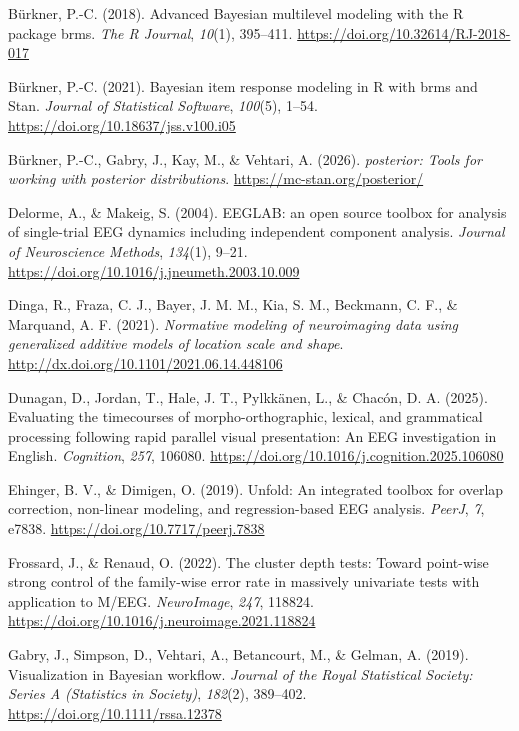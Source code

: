 \documentclass[
  doc,
  floatsintext,
  longtable,
  a4paper,
  nolmodern,
  notxfonts,
  notimes,
  colorlinks=true,linkcolor=blue,citecolor=blue,urlcolor=blue]{apa7}
\newlength{\cslhangindent}
\newenvironment{CSLReferences}[2] %
 {\begin{list}{}{%
  \setlength{\itemindent}{0pt}
  \setlength{\leftmargin}{0pt}
  \setlength{\parsep}{0pt}
  \ifodd #1
   \setlength{\leftmargin}{\cslhangindent}
   \setlength{\itemindent}{-1\cslhangindent}
  \fi
  \setlength{\itemsep}{#2\baselineskip}}}
 {\end{list}}
\begin{document}
\begin{CSLReferences}{1}{0}
Bürkner, P.-C. (2018). Advanced {Bayesian} multilevel modeling with the
{R} package {brms}. \emph{The R Journal}, \emph{10}(1), 395--411.
\url{https://doi.org/10.32614/RJ-2018-017}

Bürkner, P.-C. (2021). Bayesian item response modeling in {R} with
{brms} and {Stan}. \emph{Journal of Statistical Software},
\emph{100}(5), 1--54. \url{https://doi.org/10.18637/jss.v100.i05}

Bürkner, P.-C., Gabry, J., Kay, M., \& Vehtari, A. (2026).
\emph{{posterior}: Tools for working with posterior distributions}.
\url{https://mc-stan.org/posterior/}

Delorme, A., \& Makeig, S. (2004). EEGLAB: an open source toolbox for
analysis of single-trial EEG dynamics including independent component
analysis. \emph{Journal of Neuroscience Methods}, \emph{134}(1), 9--21.
\url{https://doi.org/10.1016/j.jneumeth.2003.10.009}

Dinga, R., Fraza, C. J., Bayer, J. M. M., Kia, S. M., Beckmann, C. F.,
\& Marquand, A. F. (2021). \emph{Normative modeling of neuroimaging data
using generalized additive models of location scale and shape}.
\url{http://dx.doi.org/10.1101/2021.06.14.448106}

Dunagan, D., Jordan, T., Hale, J. T., Pylkkänen, L., \& Chacón, D. A.
(2025). Evaluating the timecourses of morpho-orthographic, lexical, and
grammatical processing following rapid parallel visual presentation: An
EEG investigation in English. \emph{Cognition}, \emph{257}, 106080.
\url{https://doi.org/10.1016/j.cognition.2025.106080}

Ehinger, B. V., \& Dimigen, O. (2019). Unfold: An integrated toolbox for
overlap correction, non-linear modeling, and regression-based {EEG}
analysis. \emph{PeerJ}, \emph{7}, e7838.
\url{https://doi.org/10.7717/peerj.7838}

Frossard, J., \& Renaud, O. (2022). The cluster depth tests: Toward
point-wise strong control of the family-wise error rate in massively
univariate tests with application to M/EEG. \emph{NeuroImage},
\emph{247}, 118824.
\url{https://doi.org/10.1016/j.neuroimage.2021.118824}

Gabry, J., Simpson, D., Vehtari, A., Betancourt, M., \& Gelman, A.
(2019). Visualization in Bayesian work{fl}ow. \emph{Journal of the Royal
Statistical Society: Series A (Statistics in Society)}, \emph{182}(2),
389--402. \url{https://doi.org/10.1111/rssa.12378}


\end{CSLReferences}
\end{document}

